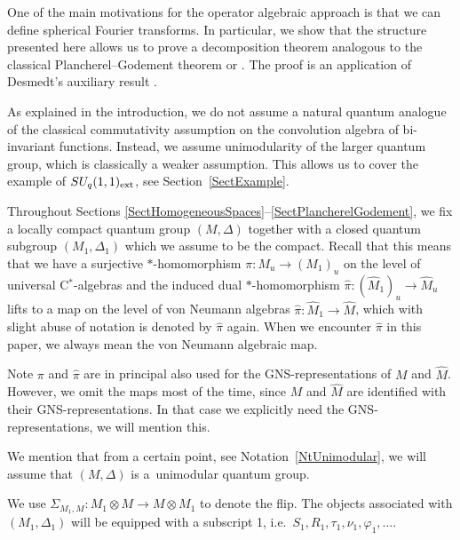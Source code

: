 One of the main motivations for the operator algebraic approach is that we can def\/ine sphe\-ri\-cal Fourier transforms. In particular, we show that  the structure   presented here allows us to prove a decomposition theorem analogous to the classical Plancherel--Godement theorem  \cite[Th\'eor\`eme~IV.2]{Far} or \cite[Section~6]{Dij}. The proof is an application of Desmedt's auxiliary result \cite[Theorem~3.4.5]{Des}.

As explained in the introduction, we do not assume a natural quantum analogue of the classical commutativity assumption on the convolution algebra of bi-invariant functions. Instead, we assume unimodularity of the larger quantum group, which is classically a weaker assumption. This allows us to cover the example of $SU_q(1,1)_{\rm ext}$, see Section~\ref{SectExample}.


\begin{nt}
Throughout Sections \ref{SectHomogeneousSpaces}--\ref{SectPlancherelGodement}, we f\/ix a locally compact quantum group $(M, \Delta)$ together with a closed quantum subgroup $(M_1,\Delta_1)$ which we assume to be the compact. Recall \cite[Def\/inition~2.9]{VaeVaiLow} that this means that we have a surjective $\ast$-homomorphism $\pi: M_u \rightarrow (M_1)_u$ on the level of universal C$^\ast$-algebras and the induced dual $\ast$-homomorphism $\hat{\pi}: (\hat{M}_1)_u \rightarrow \hat{M}_u$ lifts to a map on the level of von Neumann algebras $\hat{\pi}: \hat{M}_1 \rightarrow \hat{M}$, which with slight abuse of notation is denoted by $\hat{\pi}$ again. When we encounter $\hat{\pi}$ in this paper, we always mean the von Neumann algebraic map.

Note $\pi$ and $\hat{\pi}$ are in principal also used for the GNS-representations of $M$ and $\hat{M}$. However, we omit the maps most of the time, since $M$ and $\hat{M}$ are identif\/ied with their GNS-representations. In that case we explicitly need the GNS-representations, we will mention this.

 We mention that from a certain point, see Notation~\ref{NtUnimodular}, we will assume that $(M, \Delta)$ is a~unimodular quantum group.

We use $\Sigma_{M_1, M}: M_1 \otimes M \rightarrow M \otimes M_1$ to denote the f\/lip. The objects associated with $(M_1, \Delta_1)$ will be equipped with a subscript 1, i.e.\ $S_1, R_1, \tau_1, \nu_1, \varphi_1, \ldots$.
\end{nt}


